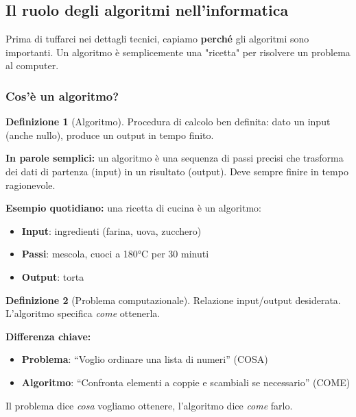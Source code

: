\documentclass[a4paper, 11pt]{article}
\theoremstyle{definition}
\newtheorem{definizione}{Definizione}[section]
\theoremstyle{remark}
\theoremstyle{remark}
\newenvironment{nota}{%
	\begin{tcolorbox}[
		colback=codebg,
		colframe=primary,
		fonttitle=\bfseries,
		title=Nota,
		left=6pt, right=6pt, top=4pt, bottom=4pt
		]
	}{%
	\end{tcolorbox}
}
\begin{document}
	\subsection{Il ruolo degli algoritmi nell'informatica}
	
	\begin{softnote}
		Prima di tuffarci nei dettagli tecnici, capiamo \textbf{perché} gli algoritmi sono importanti. Un algoritmo è semplicemente una "ricetta" per risolvere un problema al computer.
	\end{softnote}
	
	\subsubsection{Cos'è un algoritmo?}
	
	\begin{definizione}[Algoritmo]
		Procedura di calcolo ben definita: dato un input (anche nullo), produce un output
		in tempo finito.
	\end{definizione}
	
	\begin{nota}
		\textbf{In parole semplici:} un algoritmo è una sequenza di passi precisi che trasforma dei dati di partenza (input) in un risultato (output). Deve sempre finire in tempo ragionevole.
		
		\textbf{Esempio quotidiano:} una ricetta di cucina è un algoritmo:
		\begin{itemize}
			\item \textbf{Input}: ingredienti (farina, uova, zucchero)
			\item \textbf{Passi}: mescola, cuoci a 180°C per 30 minuti
			\item \textbf{Output}: torta
		\end{itemize}
	\end{nota}
	
	\begin{definizione}[Problema computazionale]
		Relazione input/output desiderata. L'algoritmo specifica \textit{come} ottenerla.
	\end{definizione}
	
	\begin{softnote}
		\textbf{Differenza chiave:}
		\begin{itemize}
			\item \textbf{Problema}: ``Voglio ordinare una lista di numeri'' (COSA)
			\item \textbf{Algoritmo}: ``Confronta elementi a coppie e scambiali se necessario'' (COME)
		\end{itemize}
		Il problema dice \textit{cosa} vogliamo ottenere, l'algoritmo dice \textit{come} farlo.
	\end{softnote}
	
\end{document}
